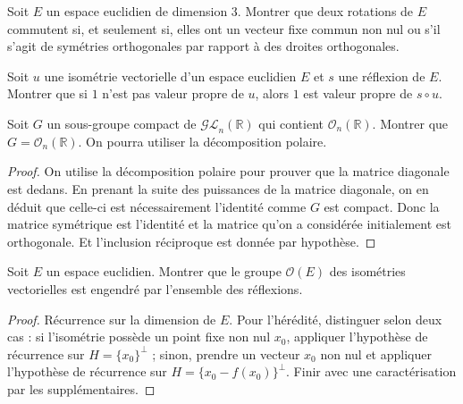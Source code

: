\documentclass[french,a4paper]{article}
\newcommand{\R}{\mathbb{R}}
\theoremstyle{plain}
\theoremstyle{definition}
\theoremstyle{remark}
\begin{document}
\begin{ex}{}
	Soit $E$ un espace euclidien de dimension $3$. Montrer que deux rotations de $E$ commutent si, et seulement si, elles ont un vecteur fixe commun non nul ou s'il s'agit de symétries orthogonales par rapport à des droites orthogonales.
\end{ex}

\begin{ex}{}
	Soit $u$ une isométrie vectorielle d'un espace euclidien $E$ et $s$ une réflexion de $E$. Montrer que si $1$ n'est pas valeur propre de $u$, alors $1$ est valeur propre de $s\circ u$.
\end{ex}

\begin{ex}{}
	Soit $G$ un sous-groupe compact de $\mathcal{GL}_n(\R)$ qui contient $\mathcal{O}_n(\R)$. Montrer que $G=\mathcal{O}_n(\R)$. On pourra utiliser la décomposition polaire.
\end{ex}
\begin{proof}
	On utilise la décomposition polaire pour prouver que la matrice diagonale est dedans. En prenant la suite des puissances de la matrice diagonale, on en déduit que celle-ci est nécessairement l'identité comme $G$ est compact. Donc la matrice symétrique est l'identité et la matrice qu'on a considérée initialement est orthogonale. Et l'inclusion réciproque est donnée par hypothèse.
\end{proof}

\begin{ex}{}
	Soit $E$ un espace euclidien. Montrer que le groupe $\mathcal{O}(E)$ des isométries vectorielles est engendré par l'ensemble des réflexions.
\end{ex}
\begin{proof}
	Récurrence sur la dimension de $E$. Pour l'hérédité, distinguer selon deux cas : si l'isométrie possède un point fixe non nul $x_0$, appliquer l'hypothèse de récurrence sur $H=\{x_0\}^\bot$ ; sinon, prendre un vecteur $x_0$ non nul et appliquer l'hypothèse de récurrence sur $H=\{x_0-f(x_0)\}^\bot$. Finir avec une caractérisation par les supplémentaires.
\end{proof}
\end{document}
